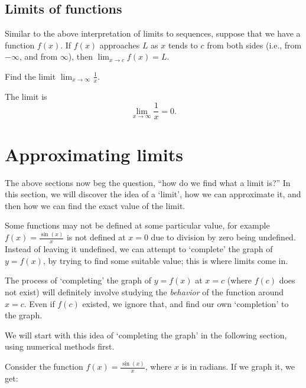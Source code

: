\subsection{Limits of functions}
Similar to the above interpretation of limits to sequences, suppose that we have a function
$f(x)$. If $f(x)$ approaches $L$ as $x$ tends to $c$ from both sides (i.e., from $-\infty$, and from $\infty$),
then $\lim_{x \to c} f(x) = L$.

\begin{example}
    Find the limit $\lim_{x \to \infty} \frac{1}{x}$.
\end{example}
\begin{solution}
    The limit is \[\lim_{x \to \infty} \frac{1}{x} = 0.\]
\end{solution}

\section{Approximating limits}
The above sections now beg the question, ``how do we find what a limit is?'' In this section, we will discover the
idea of a `limit', how we can approximate it, and then how we can find the exact value of the limit.

Some functions may not be defined at some particular value, for example
$f(x) = \frac{\sin(x)}{x}$ is not defined at $x = 0$ due to division by zero being undefined.
Instead of leaving it undefined, we can attempt to `complete' the graph of $y = f(x)$, by trying
to find some suitable value; this is where limits come in.

The process of `completing' the graph of $y = f(x)$ at $x = c$ (where $f(c)$ does not exist) will
definitely involve studying the \textit{behavior} of the function around $x = c$. Even if $f(c)$ existed,
we ignore that, and find our own `completion' to the graph.

We will start with this idea of `completing the graph' in the following section, using numerical methods first.

Consider the function $f(x) = \frac{\sin(x)}{x}$, where $x$ is in radians. If we graph it, we get:

